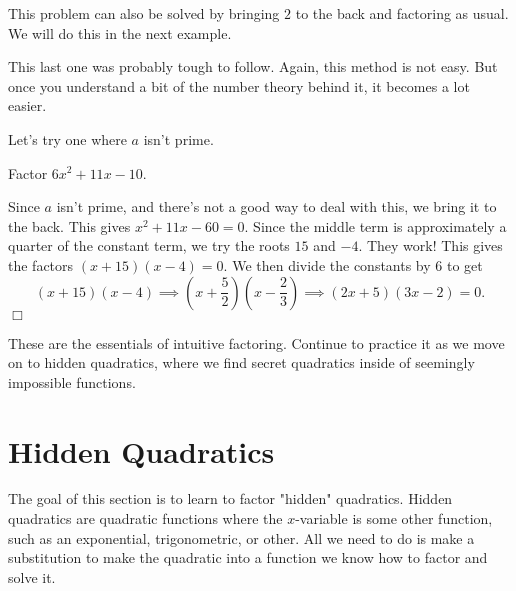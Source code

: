 \documentclass[../book.tex]{subfiles}
\begin{document}
\begin{remark}
  This problem can also be solved by bringing $2$ to the back and factoring as usual.  We will do this in the next example.
\end{remark}
This last one was probably tough to follow.  Again, this method is not easy.  But once you understand a bit of the number theory behind it, it becomes a lot easier.

Let's try one where $a$ isn't prime.
\begin{example}
Factor $6x^2+11x-10$.
\end{example}
\begin{solution}
Since $a$ isn't prime, and there's not a good way to deal with this, we bring it to the back.  This gives $x^2+11x-60=0$.  Since the middle term is approximately a quarter of the constant term, we try the roots $15$ and $-4$.  They work!  This gives the factors $(x+15)(x-4)=0$.  We then divide the constants by $6$ to get $$(x+15)(x-4)\implies \left(x+\dfrac{5}{2}\right)\left(x-\dfrac{2}{3}\right)\implies (2x+5)(3x-2)=0.$$ $\Box$
\end{solution}
These are the essentials of intuitive factoring.  Continue to practice it as we move on to hidden quadratics, where we find secret quadratics inside of seemingly impossible functions.
\section{Hidden Quadratics}
\noindent The goal of this section is to learn to factor "hidden" quadratics.  Hidden quadratics are quadratic functions where the $x$-variable is some other function, such as an exponential, trigonometric, or other.  All we need to do is make a substitution to make the quadratic into a function we know how to factor and solve it.
\end{document}
